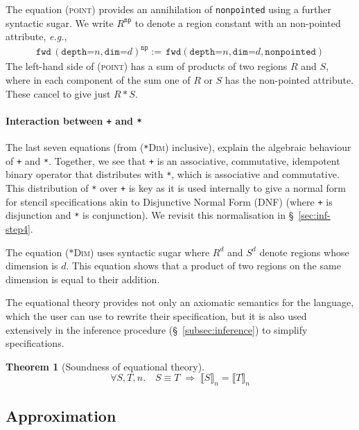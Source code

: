 \documentclass[10pt,preprint]{sigplanconf}
\newcounter{block}
\theoremstyle{definition}
\newtheorem{theorem}[block]{Theorem}
\newcommand{\eg}{\emph{e.g.}}
\newcommand{\interp}[1]{\llbracket{#1}\rrbracket}
\newcommand{\term}[1]{\texttt{#1}}
\newcommand{\irrefl}{\texttt{nonpointed}}
\newcommand{\stenFwdS}[2]{\term{fwd} \, (\term{depth=}#1,
  \term{dim=}#2)}
\newcommand{\irreflS}{\texttt{np}}
\newcommand{\stenFwdSR}[3]{\term{fwd} (\term{depth=}#1,
  \term{dim=}#2, #3)}
\begin{document}
The equation (\textsc{point}) provides an annihilation of
\irrefl{} using a further syntactic sugar.
We write $R^{\irreflS}$ to denote a region constant with an
non-pointed attribute, \eg{},
\begin{align*}
\stenFwdS{n}{d}^{\irreflS}  := \,
\stenFwdSR{n}{d}{\irrefl}
\end{align*}
The left-hand side of (\textsc{point}) has a sum of
products of two regions $R$ and $S$,
where in each component of the sum one of $R$
or $S$ has the non-pointed attribute. These cancel to give
just $R \, \term{*} \, S$.

\paragraph{Interaction between \term{+} and \term{*}}

The last seven equations (from (\textsc{\term{*}Dim}) inclusive), explain
the algebraic behaviour of \term{+} and \term{*}.  Together, we see
that \term{+} is an associative, commutative, idempotent binary
operator that distributes with \term{*}, which is associative and
commutative. This distribution of \term{*} over \term{+} is key as it
is used internally to give a normal form for stencil specifications
akin to Disjunctive Normal Form (DNF) (where \term{+} is
disjunction and \term{*} is conjunction). We revisit this
normalisation in \S~\ref{sec:inf-step4}.

The equation (\textsc{$\ast$Dim}) uses syntactic sugar
where $R^d$ and $S^d$ denote regions whose dimension is $d$.
This equation shows that a product of two regions on
the same dimension is equal to their addition.

The equational theory provides not only an axiomatic semantics
for the language, which the user can use to rewrite their
specification, but it is also used extensively in the inference
procedure (\S~\ref{subsec:inference}) to simplify specifications.

\begin{theorem}[Soundness of equational theory]
\begin{equation*}
\forall S, T, n . \quad
S \equiv T \; \Rightarrow \;
\interp{S}_n = \interp{T}_n
\end{equation*}
\end{theorem}

\subsection{Approximation}
\end{document}
